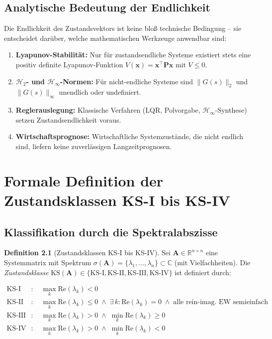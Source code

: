 ﻿\documentclass[12pt, a4paper, titlepage]{report}
\theoremstyle{definition}
\newtheorem{definition}[theorem]{Definition}
\theoremstyle{remark}
\newcommand{\R}{\mathbb{R}}
\newcommand{\C}{\mathbb{C}}
\newcommand{\vx}{\bm{x}}
\newcommand{\vA}{\bm{A}}
\newcommand{\vP}{\bm{P}}
\newcommand{\T}{\top}
\newcommand{\spec}{\sigma}
\newcommand{\re}{\mathrm{Re}}
\newcommand{\KS}{\mathrm{KS}}
\begin{document}
\section{Analytische Bedeutung der Endlichkeit}

Die Endlichkeit des Zustandsvektors ist keine bloß technische Bedingung -- sie
entscheidet darüber, welche mathematischen Werkzeuge anwendbar sind:

\begin{enumerate}[label=(\arabic*)]
  \item \textbf{Lyapunov-Stabilität:} Nur für zustandsendliche Systeme existiert stets
    eine positiv definite Lyapunov-Funktion $V(\vx) = \vx^\T\vP\vx$ mit
    $\dot{V} \leq 0$.
  \item \textbf{$\mathcal{H}_2$- und $\mathcal{H}_\infty$-Normen:} Für
    nicht-endliche Systeme sind $\|G(s)\|_2$ und $\|G(s)\|_\infty$ unendlich oder
    undefiniert.
  \item \textbf{Reglerauslegung:} Klassische Verfahren (LQR, Polvorgabe, $\mathcal{H}_\infty$-Synthese)
    setzen Zustandsendlichkeit voraus.
  \item \textbf{Wirtschaftsprognose:} Wirtschaftliche Systemzustände, die nicht endlich
    sind, liefern keine zuverlässigen Langzeitprognosen.
\end{enumerate}

\chapter{Formale Definition der Zustandsklassen KS-I bis KS-IV}
\label{sec:klassen}

\section{Klassifikation durch die Spektralabszisse}

\begin{definition}[Zustandsklassen KS-I bis KS-IV]
\label{def:klassen}
Sei $\vA \in \R^{n \times n}$ eine Systemmatrix mit Spektrum
$\spec(\vA) = \{\lambda_1, \ldots, \lambda_n\} \subset \C$ (mit Vielfachheiten).
Die \emph{Zustandsklasse} $\KS(\vA) \in \{\KS\text{-I}, \KS\text{-II}, \KS\text{-III}, \KS\text{-IV}\}$
ist definiert durch:

\begin{align}
  \KS\text{-I}  &: \quad \max_k \re(\lambda_k) < 0
                \label{eq:ks1} \\
  \KS\text{-II} &: \quad \max_k \re(\lambda_k) \leq 0 \;\wedge\;
                  \exists\,k: \re(\lambda_k) = 0 \;\wedge\;
                  \text{alle rein-imag. EW semieinfach}
                \label{eq:ks2} \\
  \KS\text{-III}&: \quad \max_k \re(\lambda_k) > 0 \;\wedge\;
                  \min_k \re(\lambda_k) \geq 0
                \label{eq:ks3} \\
  \KS\text{-IV} &: \quad \max_k \re(\lambda_k) > 0 \;\wedge\;
                  \min_k \re(\lambda_k) < 0
                \label{eq:ks4}
\end{align}
\end{definition}
\end{document}
